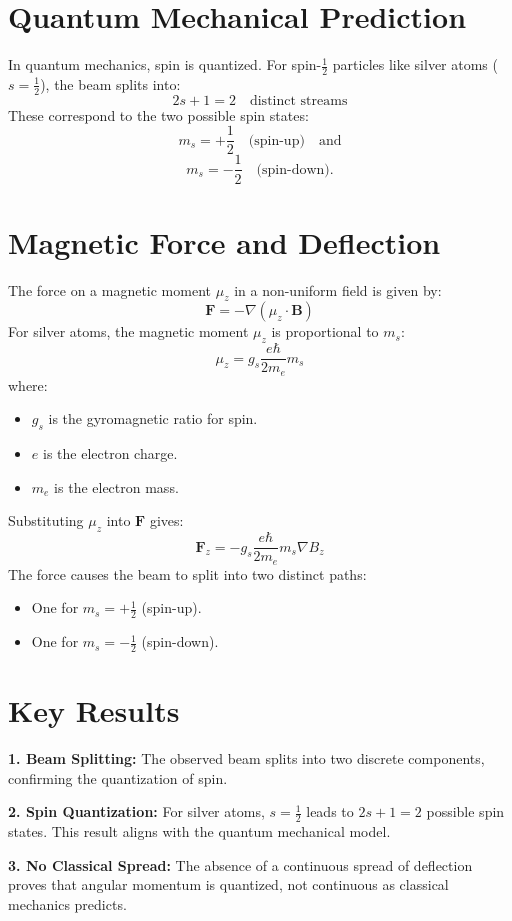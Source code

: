 \documentclass[a4paper,12pt]{article}
\begin{document}
\begin{multicols}{2}
\section*{Quantum Mechanical Prediction}
In quantum mechanics, spin is quantized. For spin-$\frac{1}{2}$ particles like silver atoms ($s = \frac{1}{2}$), the beam splits into:
\[
2s + 1 = 2 \quad \text{distinct streams}
\]
These correspond to the two possible spin states: 
\[
m_s = +\frac{1}{2} \quad \text{(spin-up)} \quad \text{and}
\]
\[
m_s = -\frac{1}{2} \quad \text{(spin-down)}.
\]

\section*{Magnetic Force and Deflection}
The force on a magnetic moment $\mu_z$ in a non-uniform field is given by:
\[
\mathbf{F} = -\nabla(\mu_z \cdot \mathbf{B})
\]
For silver atoms, the magnetic moment $\mu_z$ is proportional to $m_s$:
\[
\mu_z = g_s \frac{e \hbar}{2m_e} m_s
\]
where:
\begin{itemize}
    \item $g_s$ is the gyromagnetic ratio for spin.
    \item $e$ is the electron charge.
    \item $m_e$ is the electron mass.
\end{itemize}
Substituting $\mu_z$ into $\mathbf{F}$ gives:
\[
\mathbf{F}_z = -g_s \frac{e \hbar}{2m_e} m_s \nabla B_z
\]
The force causes the beam to split into two distinct paths:
\begin{itemize}
    \item One for $m_s = +\frac{1}{2}$ (spin-up).
    \item One for $m_s = -\frac{1}{2}$ (spin-down).
\end{itemize}

\section*{Key Results}
\textbf{1. Beam Splitting:}  
The observed beam splits into two discrete components, confirming the quantization of spin.

\textbf{2. Spin Quantization:}  
For silver atoms, $s = \frac{1}{2}$ leads to $2s + 1 = 2$ possible spin states. This result aligns with the quantum mechanical model.

\textbf{3. No Classical Spread:}  
The absence of a continuous spread of deflection proves that angular momentum is quantized, not continuous as classical mechanics predicts.


\end{multicols}
\end{document}
